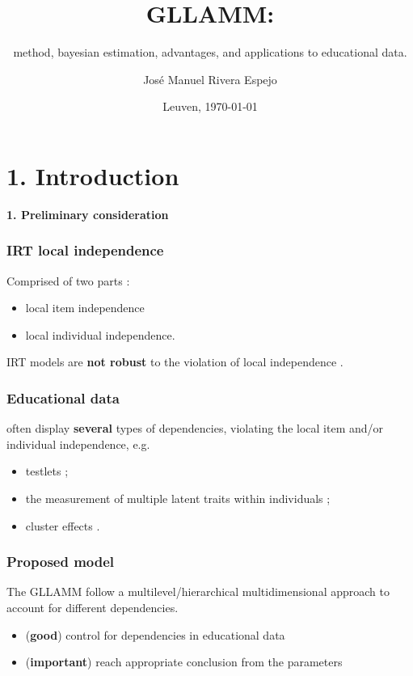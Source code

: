 \documentclass[arial,12pt,xcolor=dvipsnames]{beamer}
\title{GLLAMM:}
\subtitle{method, bayesian estimation, advantages, and applications to educational data.}
\author{{Jos\'e Manuel Rivera Espejo}}
\institute{
	\textbf{\small{Master of Science in Statistics and Data Science}}
	\and
	\small{KU Leuven}}
\date{\tiny{Leuven, \today}}
\begin{document}
%
%
\frame{\titlepage}
%
%
\section{1. Introduction}
%
\begin{frame}
	\textbf{1. Preliminary consideration}
\end{frame}
%
\begin{frame}
	\frametitle{IRT local independence}
	Comprised of two parts \cite{Baker_2001, Hambleton_et_al_1991a}:
	\begin{itemize}
		\item local item independence 
		\item local individual independence.
	\end{itemize}
	\vspace{0.3cm} IRT models are \textbf{not robust} to the violation of local independence \cite{Yen_1984, Chen_et_al_1997, Jiao_et_al_2012}. 
\end{frame}
%
\begin{frame}
	\frametitle{Educational data}
	often display \textbf{several} types of dependencies, violating the local item and/or individual independence, e.g.
	\begin{itemize}
		\item testlets \cite{Wainer_et_al_2007};  
		\item the measurement of multiple latent traits within individuals \cite{Reckase_2009}; 
		\item cluster effects \cite{Raudenbush_et_al_2002}.
	\end{itemize}
\end{frame}
%
\begin{frame}
	\frametitle{Proposed model}
	The GLLAMM follow a multilevel/hierarchical multidimensional approach to account for different dependencies. \\
	\begin{itemize}
		\item (\textbf{good}) control for dependencies in educational data
		\item (\textbf{important}) reach appropriate conclusion from the parameters 
	\end{itemize}
\end{frame}
\end{document}
